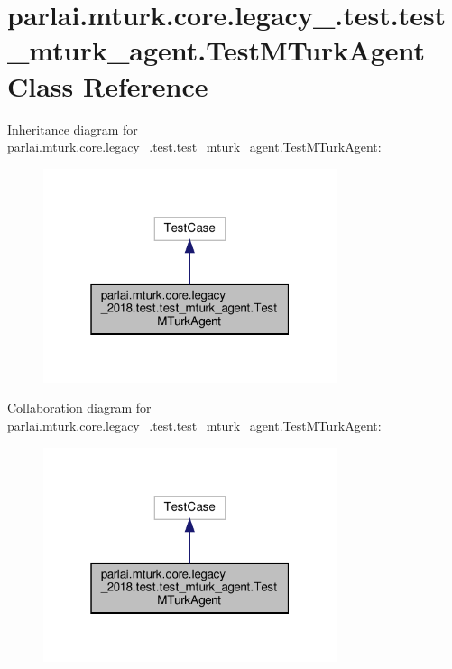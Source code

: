 \hypertarget{classparlai_1_1mturk_1_1core_1_1legacy__2018_1_1test_1_1test__mturk__agent_1_1TestMTurkAgent}{}\section{parlai.\+mturk.\+core.\+legacy\+\_.\+test.\+test\+\_\+mturk\+\_\+agent.\+Test\+M\+Turk\+Agent Class Reference}
\label{classparlai_1_1mturk_1_1core_1_1legacy__2018_1_1test_1_1test__mturk__agent_1_1TestMTurkAgent}


Inheritance diagram for parlai.\+mturk.\+core.\+legacy\+\_.\+test.\+test\+\_\+mturk\+\_\+agent.\+Test\+M\+Turk\+Agent\+:\nopagebreak
\begin{figure}[H]
\begin{center}
\leavevmode
\includegraphics[width=244pt]{da/d86/classparlai_1_1mturk_1_1core_1_1legacy__2018_1_1test_1_1test__mturk__agent_1_1TestMTurkAgent__inherit__graph}
\end{center}
\end{figure}


Collaboration diagram for parlai.\+mturk.\+core.\+legacy\+\_.\+test.\+test\+\_\+mturk\+\_\+agent.\+Test\+M\+Turk\+Agent\+:\nopagebreak
\begin{figure}[H]
\begin{center}
\leavevmode
\includegraphics[width=244pt]{df/de6/classparlai_1_1mturk_1_1core_1_1legacy__2018_1_1test_1_1test__mturk__agent_1_1TestMTurkAgent__coll__graph}
\end{center}
\end{figure}
